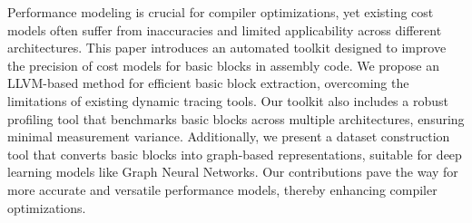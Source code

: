 Performance modeling is crucial for compiler optimizations, yet existing cost models often suffer from
inaccuracies and limited applicability across different architectures. This paper introduces an automated 
toolkit designed to improve the precision of cost models for basic blocks in assembly code. We propose an 
LLVM-based method for efficient basic block extraction, overcoming the limitations of existing dynamic 
tracing tools. Our toolkit also includes a robust profiling tool that benchmarks basic blocks across 
multiple architectures, ensuring minimal measurement variance. Additionally, we present a dataset 
construction tool that converts basic blocks into graph-based representations, suitable for deep 
learning models like Graph Neural Networks. Our contributions pave the way for more accurate and 
versatile performance models, thereby enhancing compiler optimizations.